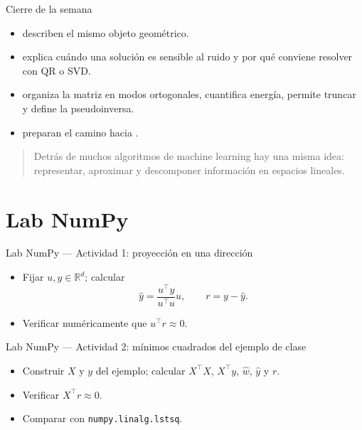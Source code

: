 \begin{frame}{Cierre de la semana}
\begin{itemize}\small
  \item {} describen el mismo objeto geométrico.
  \item {} explica cuándo una solución es sensible al ruido y por qué conviene resolver con QR o SVD.
  \item {} organiza la matriz en modos ortogonales, cuantifica energía, permite truncar y define la pseudoinversa.
  \item {} preparan el camino hacia .
\end{itemize}
\vspace{0.3em}
\begin{quote}\small
Detrás de muchos algoritmos de machine learning hay una misma idea: representar, aproximar y descomponer información en espacios lineales.
\end{quote}
\end{frame}

\section[Lab NumPy]{Lab NumPy\label{sec:lab-numpy-w07-final}}

\begin{frame}{Lab NumPy — Actividad 1: proyección en una dirección}
\begin{itemize}\small
  \item Fijar $u,y\in\mathbb{R}^d$; calcular
  \[
    \hat y = \frac{u^\top y}{u^\top u}u,
    \qquad
    r=y-\hat y.
  \]
  \item Verificar numéricamente que $u^\top r \approx 0$.
\end{itemize}
\end{frame}

\begin{frame}{Lab NumPy — Actividad 2: mínimos cuadrados del ejemplo de clase}
\begin{itemize}\small
  \item Construir $X$ y $y$ del ejemplo; calcular $X^\top X$, $X^\top y$, $\hat w$, $\hat y$ y $r$.
  \item Verificar $X^\top r\approx 0$.
  \item Comparar con \texttt{numpy.linalg.lstsq}.
\end{itemize}
\end{frame}

